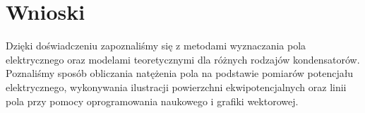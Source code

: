 \documentclass{article}
\begin{document}
\section{Wnioski}

Dzięki doświadczeniu zapoznaliśmy się z metodami wyznaczania pola elektrycznego oraz modelami teoretycznymi dla różnych rodzajów kondensatorów. Poznaliśmy sposób obliczania natężenia pola na podstawie pomiarów potencjału elektrycznego, wykonywania ilustracji powierzchni ekwipotencjalnych oraz linii pola przy pomocy oprogramowania naukowego i grafiki wektorowej.




\end{document}
